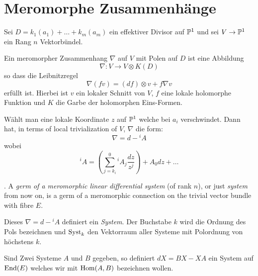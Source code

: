 \chapter{Meromorphe Zusammenhänge}
\begin{comment}
Siehe:
\begin{itemize}
  \item \cite{sabbah2007isomonodromic}
\end{itemize}
\end{comment}
%
Sei $D=k_1(a_1)+\dots+k_m(a_m)$ ein effektiver Divisor auf $\P^1$ und sei
$V\to\P^1$ ein Rang $n$ Vektorbündel.
\begin{defn}
Ein meromorpher Zusammenhang $\nabla$ auf $V$ mit Polen auf $D$ ist eine
Abbildung
\[
  \nabla: V\to V\otimes K(D)
\]
so dass die Leibnitzregel
\begin{equation}
  \nabla(fv)=(df)\otimes v + f\nabla v
\end{equation}
erfüllt ist. Hierbei ist $v$ ein lokaler Schnitt von $V$, $f$ eine lokale
holomorphe Funktion und $K$ die Garbe der holomorphen Eins-Formen.
\end{defn}
%
\begin{comment}
\begin{prop}
Die Differenz zweier meromorphen Zusammenhänge ist $???$-linear.
\end{prop}
\begin{proof}
Denn für zwei meromorphe Zusammenhänge $\nabla_1$ und $\nabla_2$ gilt:
\begin{align*}
(\nabla_1 - \nabla_2)(fv) &= \nabla_1(fv) - \nabla_2(fv)
\\&=(df)\otimes v + f\nabla_1 v -(df)\otimes v - f\nabla_2 v
\\&=f\nabla_1 v - f\nabla_2 v
\\&=f(\nabla_1 - \nabla_2) v
\end{align*}
und da ??? gilt, reicht dies um die Aussage zu zeigen
\end{proof}
\end{comment}

\begin{paracol}{2}
Wählt man eine lokale Koordinate $z$ auf $\P^1$ welche bei $a_i$
verschwindet. Dann hat, in terms of local trivialization of $V$, $\nabla$ die
form:
\[
\nabla = d-{}^iA
\]
wobei
\[
{}^iA=\left(\sum^{0}_{j=k_i}{}^iA_j\frac{dz}{z^{j}}\right)+A_0dz+\dots
\]
\switchcolumn %
\begin{defn}
\cite[Def 1.5]{thboalch}.
A \emph{germ of a meromorphic linear differential system} (of rank $n$), or
just \emph{system} from now on, is a germ of a meromorphic connection on the
trivial vector bundle with fibre $E$.
\end{defn}
Dieses $\nabla = d-{}^iA$ definiert ein \emph{System}. Der Buchstabe $k$ wird
die Ordnung des Pols bezeichnen und $\Syst_k$ den Vektorraum aller Systeme mit
Polordnung von höchstens $k$.

Sind Zwei Systeme $A$ und $B$ gegeben, so definiert $dX=BX-XA$ ein System auf
$\End(E)$ welches wir mit $\Hom(A,B)$ bezeichnen wollen.
\end{paracol}


